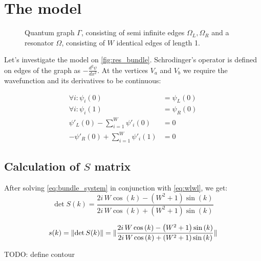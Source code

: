 \documentclass[12pt, a4paper]{article}
\theoremstyle{plain}
\DeclarePairedDelimiter\abs{\lvert}{\rvert}%
\begin{document}
\section{The model}
\begin{figure}
\centering
\begin{tikzpicture}[scale=1.1] %

\end{tikzpicture}
\caption{Quantum graph $\Gamma$, consisting of semi infinite edges $\Omega_L, \Omega_R$ and a resonator $\Omega$, consisting of $W$ identical edges of length 1.}
\label{fig:res_bundle}
\end{figure}

Let's investigate the model on \autoref{fig:res_bundle}. Schrodinger's operator is defined on edges of the graph as  $-\frac{d^2 \psi}{dx^2}$. At the vertices $V_a$ and $V_b$ we require the wavefunction and its derivatives to be continuous:

\begin{equation}\label{eq:bundle_system}
\begin{aligned}
   \forall i: \psi_i(0) &= \psi_L(0)
\\ \forall i: \psi_i(1) &= \psi_R(0)
\\ \psi'_L(0) - \sum\limits_{i = 1}^W \psi'_i(0) &= 0
\\ -\psi'_R(0) + \sum\limits_{i = 1}^W \psi'_i(1) &= 0
\end{aligned}
\end{equation}

\subsection{Calculation of $S$ matrix}
After solving \ref{eq:bundle_system} in conjunction with \ref{eq:wlwl}, we get:
\begin{equation*}
\det S(k) = \frac{2 i \, W \cos\left(k\right) - {\left(W^{2} + 1\right)} \sin\left(k\right)}{2 i \, W \cos\left(k\right) + {\left(W^{2} + 1\right)} \sin\left(k\right)}
\end{equation*}


\begin{equation}\label{eq:bundle_s}
s(k) = \abs{\det S(k)} = \abs{\frac{2 i \, W \cos\left(k\right) - {\left(W^{2} + 1\right)} \sin\left(k\right)}{2 i \, W \cos\left(k\right) + {\left(W^{2} + 1\right)} \sin\left(k\right)}}
\end{equation}

TODO: define contour
\end{document}
